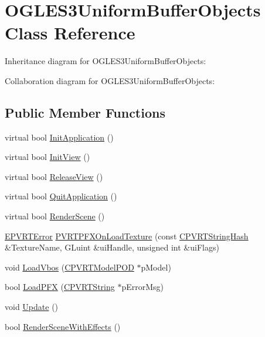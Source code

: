 \hypertarget{class_o_g_l_e_s3_uniform_buffer_objects}{\section{O\+G\+L\+E\+S3\+Uniform\+Buffer\+Objects Class Reference}
\label{class_o_g_l_e_s3_uniform_buffer_objects}
}


Inheritance diagram for O\+G\+L\+E\+S3\+Uniform\+Buffer\+Objects\+:


Collaboration diagram for O\+G\+L\+E\+S3\+Uniform\+Buffer\+Objects\+:
\subsection*{Public Member Functions}
\begin{DoxyCompactItemize}
\item 
virtual bool \hyperlink{class_o_g_l_e_s3_uniform_buffer_objects_adcd40ab33833a02bc94b8ceb19c85910}{Init\+Application} ()
\item 
virtual bool \hyperlink{class_o_g_l_e_s3_uniform_buffer_objects_afc010d6972a8b2a976a4ffc21440df1a}{Init\+View} ()
\item 
virtual bool \hyperlink{class_o_g_l_e_s3_uniform_buffer_objects_af85fa8198d1a8396424775ff5b679df9}{Release\+View} ()
\item 
virtual bool \hyperlink{class_o_g_l_e_s3_uniform_buffer_objects_a405d0ba76561b7cad2941c5dac1f62fa}{Quit\+Application} ()
\item 
virtual bool \hyperlink{class_o_g_l_e_s3_uniform_buffer_objects_a63dcb840b0f7fafe5750d4bfd147d34d}{Render\+Scene} ()
\item 
\hyperlink{_p_v_r_t_error_8h_a9e837ff1a83f3a5f332bc4cc78454608}{E\+P\+V\+R\+T\+Error} \hyperlink{class_o_g_l_e_s3_uniform_buffer_objects_a1e67140c3d440ca1ebe87e9a47697f05}{P\+V\+R\+T\+P\+F\+X\+On\+Load\+Texture} (const \hyperlink{class_c_p_v_r_t_string_hash}{C\+P\+V\+R\+T\+String\+Hash} \&Texture\+Name, G\+Luint \&ui\+Handle, unsigned int \&ui\+Flags)
\item 
void \hyperlink{class_o_g_l_e_s3_uniform_buffer_objects_a602045b02eb23483b0762e7f7d78fbf2}{Load\+Vbos} (\hyperlink{class_c_p_v_r_t_model_p_o_d}{C\+P\+V\+R\+T\+Model\+P\+O\+D} $\ast$p\+Model)
\item 
bool \hyperlink{class_o_g_l_e_s3_uniform_buffer_objects_a48e2b526acdd3552f25de848e3cb7466}{Load\+P\+F\+X} (\hyperlink{class_c_p_v_r_t_string}{C\+P\+V\+R\+T\+String} $\ast$p\+Error\+Msg)
\item 
void \hyperlink{class_o_g_l_e_s3_uniform_buffer_objects_afcda4731fea94a3db92d5e58455ec3c7}{Update} ()
\item 
bool \hyperlink{class_o_g_l_e_s3_uniform_buffer_objects_a629b7d3fc220c0b24778a7b6cdb9a2a6}{Render\+Scene\+With\+Effects} ()
\end{DoxyCompactItemize}


